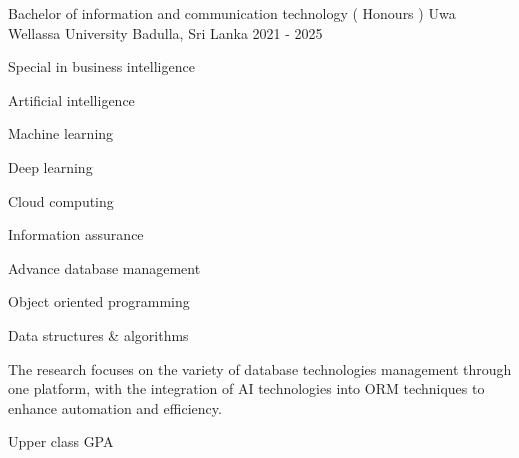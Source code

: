 

\begin{cventries}

  \cventry
    {Bachelor of information and communication technology ( Honours )} %
    {Uwa Wellassa University} %
    {Badulla, Sri Lanka} %
    {2021 - 2025} %
    {
      \begin{cvitems} %
        \item {Special in business intelligence }
        \item {Artificial intelligence}
        \item {Machine learning}
        \item {Deep learning}
        \item {Cloud computing}
        \item {Information assurance }
        \item {Advance database management}
        \item {Object oriented programming}
        \item {Data structures  &  algorithms}
        \item {The research focuses on the variety of database technologies management through one platform, with the integration of AI technologies into ORM techniques to enhance automation and efficiency.}
        \item {Upper class GPA}
      \end{cvitems}
    }

\end{cventries}
